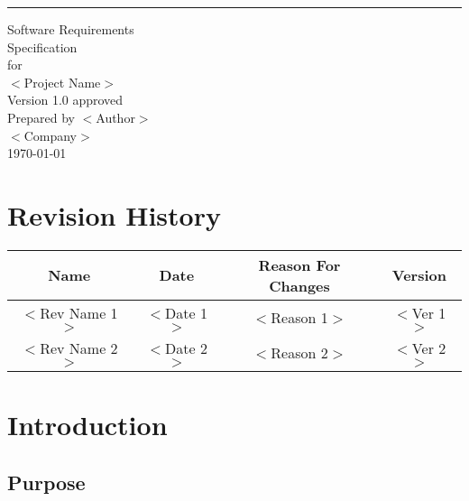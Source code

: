 \documentclass{scrreprt}
\date{}
\title{}
\def\myversion{1.0 }
\begin{document}
\begin{flushright}
    \rule{14cm}{5pt}
    \vskip1cm
    \begin{bfseries}
        \Huge{Software Requirements\\ Specification}\\
        \vspace{1.6cm}
        for\\
        \vspace{1.6cm}
        $<$Project Name$>$\\
        \vspace{1.6cm}
        \LARGE{Version \myversion approved}\\
        \vspace{1.6cm}
        Prepared by $<$Author$>$\\
        \vspace{1.6cm}
        $<$Company$>$\\
        \vspace{1.6cm}
        \today\\
    \end{bfseries}
\end{flushright}

\tableofcontents

\chapter*{Revision History}

\begin{center}
    \begin{tabular}{|c|c|c|c|}
        \hline
	    Name & Date & Reason For Changes & Version\\
        \hline
	    $<$Rev Name 1$>$ & $<$Date 1$>$ & $<$Reason 1$>$ & $<$Ver 1$>$\\
        \hline
	    $<$Rev Name 2$>$ & $<$Date 2$>$ & $<$Reason 2$>$ & $<$Ver 2$>$\\
        \hline
    \end{tabular}
\end{center}

\chapter{Introduction}

\section{Purpose}
\end{document}

